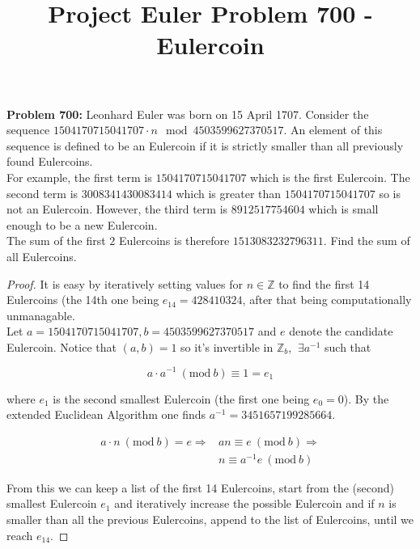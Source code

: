 \documentclass[12pt]{article}
\newcommand{\Mod}[1]{\ (\mathrm{mod}\ #1)}
\begin{document}
\title{Project Euler Problem 700 - Eulercoin}
\date{}
\author{}
\maketitle

\textbf{Problem 700:} Leonhard Euler was born on 15 April 1707. Consider the sequence $1504170715041707 \cdot n \mod 4503599627370517$. An element of this sequence is defined to be an Eulercoin if it is strictly smaller than all previously found Eulercoins. \\

For example, the first term is $1504170715041707$ which is the first Eulercoin. The second term is $3008341430083414$ which is greater than $1504170715041707$ so is not an Eulercoin. However, the third term is $8912517754604$ which is small enough to be a new Eulercoin. \\

The sum of the first $2$ Eulercoins is therefore $1513083232796311$. Find the sum of all Eulercoins.


\begin{proof}

It is easy by iteratively setting values for $n \in \mathbb{Z}$ to find the first 14 Eulercoins (the 14th one being $e_{14} = 428410324$, after that being computationally unmanagable. \\

Let $a=1504170715041707, b=4503599627370517$ and $e$ denote the candidate Eulercoin. Notice that $(a,b) = 1$ so it's invertible in $\mathbb{Z}_b$, $~ \exists a^{-1}$ such that 

$$
a \cdot a^{-1} \Mod b \equiv 1 = e_1
$$

where $e_1$ is the second smallest Eulercoin (the first one being $e_0 = 0$). By the extended Euclidean Algorithm one finds $a^{-1} = 3451657199285664$.


\begin{equation}
\begin{split}
a\cdot n\Mod b = e \Rightarrow & an \equiv e\Mod b \Rightarrow \\
& n \equiv a^{-1} e\Mod b
\end{split}
\end{equation}

From this we can keep a list of the first 14 Eulercoins, start from the (second) smallest Eulercoin $e_1$ and iteratively increase the possible Eulercoin and if $n$ is smaller than all the previous Eulercoins, append to the list of Eulercoins, until we reach $e_{14}$.
 
\end{proof}
\end{document}
